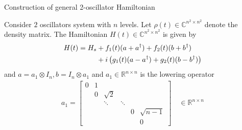 \documentclass[12pt]{article}
\begin{document}
\begin{center}
    \Large Construction of general 2-oscillator Hamiltonian
\end{center}


Consider $2$ oscillators system with $n$ levels. Let $\rho(t)\in \mathds{C}^{n^2 \times n^2}$ denote the density matrix. The Hamiltonian $H(t) \in \mathds{C}^{n^2\times n^2}$ is given by
\begin{align}
  H(t) = H_s &+ f_1(t)(a+a^{\dagger}) + f_2(t)(b+b^{\dagger}) \notag\\
         &+ i\left(g_1(t)(a-a^{\dagger}) + g_2(t)(b-b^{\dagger})\right)
\end{align}
and $a = a_1 \otimes I_n, b = I_n \otimes a_1$ and $a_1 \in \mathds{R}^{n\times n}$ is the lowering operator
\begin{align*}
    a_1 = \begin{bmatrix}
            0 &  1 & & & &\\
              &  0  & \sqrt 2 & & & \\
              &  &    \ddots & \ddots& & \\
              & & & & 0 & \sqrt{n-1} \\
              & & & &  & 0
          \end{bmatrix} \quad \in \mathds{R}^{n\times n}
\end{align*}
\end{document}
